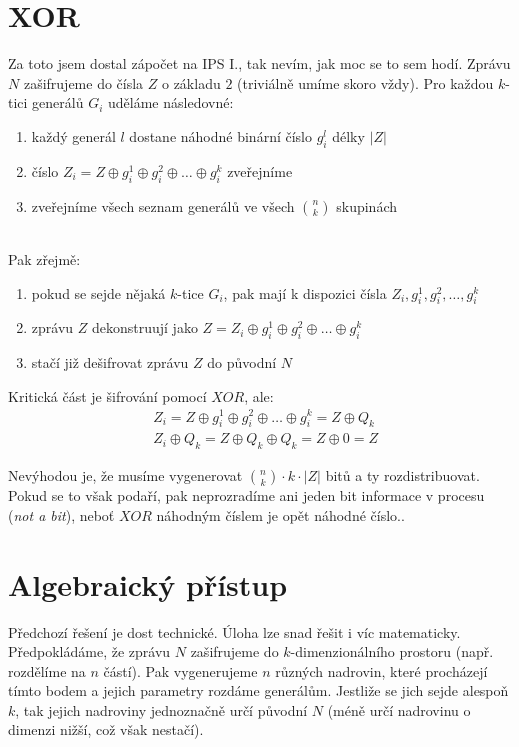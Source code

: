 \documentclass[a4paper]{article}
\begin{document}
\renewcommand{\headrulewidth}{0pt} %
\thispagestyle{fancy} %
{}

\section*{XOR}
Za toto jsem dostal zápočet na IPS I., tak nevím, jak moc se to sem hodí. Zprávu $N$ zašifrujeme do čísla $Z$ o základu $2$ (triviálně umíme skoro vždy). Pro každou $k$-tici generálů $G_i$ uděláme následovné:
\begin{enumerate}
	\item každý generál $l$ dostane náhodné binární číslo $g_i^l$ délky $|Z|$
	\item číslo $Z_i = Z \oplus g_i^1 \oplus g_i^2 \oplus \ldots \oplus g_i^k$ zveřejníme
	\item zveřejníme všech seznam generálů ve všech ${n \choose k}$ skupinách
\end{enumerate}
\text{}\\
Pak zřejmě:
\begin{enumerate}
	\item pokud se sejde nějaká $k$-tice $G_i$, pak mají k dispozici čísla $Z_i, g_i^1, g_i^2, \ldots, g_i^k$
	\item zprávu $Z$ dekonstruují jako $Z = Z_i \oplus g_i^1 \oplus g_i^2 \oplus \ldots \oplus g_i^k$
	\item stačí již dešifrovat zprávu $Z$ do původní $N$ 
\end{enumerate}

Kritická část je šifrování pomocí $XOR$, ale:
\begin{align*}
	& Z_i = Z \oplus g_i^1 \oplus g_i^2 \oplus \ldots \oplus g_i^k = Z \oplus Q_k \\
	& Z_i \oplus Q_k = Z \oplus Q_k \oplus Q_k = Z \oplus 0 = Z
\end{align*}

Nevýhodou je, že musíme vygenerovat ${n \choose k} \cdot k \cdot |Z|$ bitů a ty rozdistribuovat. Pokud se to však podaří, pak neprozradíme ani jeden bit informace v procesu (\textit{not a bit}), neboť $XOR$ náhodným číslem je opět náhodné číslo..

\section*{Algebraický přístup}
Předchozí řešení je dost technické. Úloha lze snad řešit i víc matematicky. Předpokládáme, že zprávu $N$ zašifrujeme do $k$-dimenzionálního prostoru (např. rozdělíme na $n$ částí). Pak vygenerujeme $n$ různých nadrovin, které procházejí tímto bodem a jejich parametry rozdáme generálům. Jestliže se jich sejde alespoň $k$, tak jejich nadroviny jednoznačně určí původní $N$ (méně určí nadrovinu o dimenzi nižší, což však nestačí).
\end{document}
